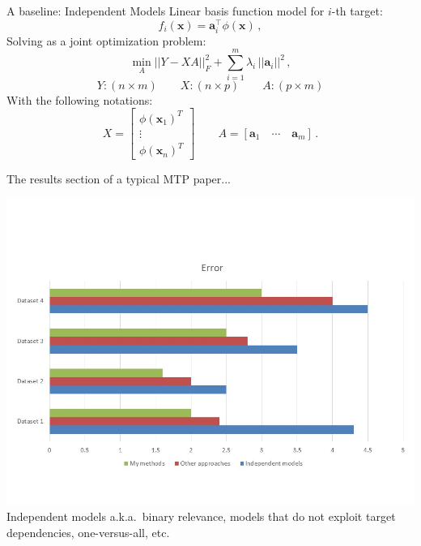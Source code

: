 \documentclass[]{beamer}
\renewcommand{\vec}[1]{\boldsymbol{#1}}
\begin{document}
\begin{frame}{A baseline: Independent Models}
\vspace{0.5cm}
Linear basis function model for $i$-th target: 
\begin{equation*}
f_i(\vec{x}) = \vec{a}_i^\intercal \phi(\vec{x}) \,,
\label{eq:binrel}
\end{equation*}
Solving as a joint optimization problem: 
\begin{equation*}
\label{eq:multiridge}
\min_A ||Y - XA ||^2_F +  \sum_{i=1}^m \lambda_i \,||\vec{a}_i||^2 \,,
\end{equation*}
$$Y: (n \times m) \qquad  X: (n \times p) \qquad A: (p \times m)$$
With the following notations: 
\begin{equation*}
\label{eq:notation}
X = \begin{bmatrix} \phi(\vec{x}_1)^T \\ \vdots \\ \phi(\vec{x}_n)^T \end{bmatrix} \qquad A = [\vec{a}_1 \quad \cdots \quad \vec{a}_m] \,.
\end{equation*}


\end{frame}

\begin{frame}{The results section of a typical MTP paper...}
\begin{center}
\includegraphics[scale=0.45, trim = 0 50 0 100,clip]{Figures/barplots} \\

Independent models a.k.a.\ binary relevance, models that do not exploit target dependencies, one-versus-all, etc.
\end{center}
\end{frame}
\end{document}
